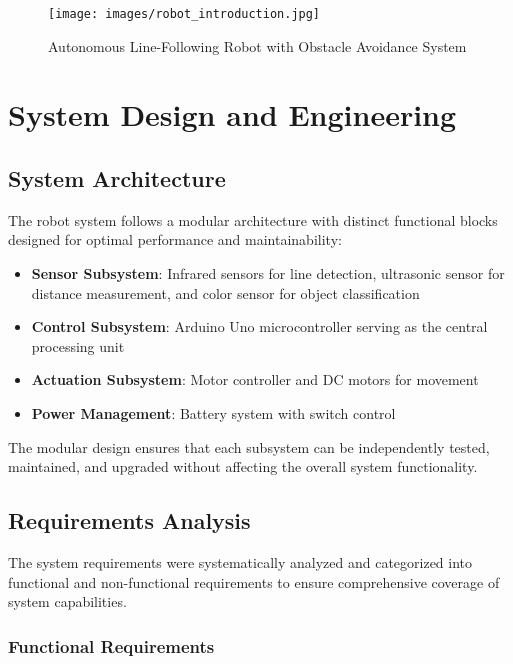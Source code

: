 \documentclass[12pt,a4paper]{article}
\begin{document}
\begin{figure}[H]
    \centering
    \texttt{[image: images/robot\_introduction.jpg]}
    \caption{Autonomous Line-Following Robot with Obstacle Avoidance System}
    \label{fig:robot_introduction}
\end{figure}

\section{System Design and Engineering}

\subsection{System Architecture}

The robot system follows a modular architecture with distinct functional blocks designed for optimal performance and maintainability:

\begin{itemize}
    \item \textbf{Sensor Subsystem}: Infrared sensors for line detection, ultrasonic sensor for distance measurement, and color sensor for object classification
    \item \textbf{Control Subsystem}: Arduino Uno microcontroller serving as the central processing unit
    \item \textbf{Actuation Subsystem}: Motor controller and DC motors for movement
    \item \textbf{Power Management}: Battery system with switch control
\end{itemize}

The modular design ensures that each subsystem can be independently tested, maintained, and upgraded without affecting the overall system functionality.

\subsection{Requirements Analysis}

The system requirements were systematically analyzed and categorized into functional and non-functional requirements to ensure comprehensive coverage of system capabilities.

\subsubsection{Functional Requirements}
\end{document}
